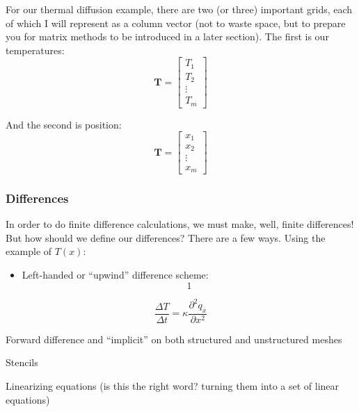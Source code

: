 \documentclass[a4paper,10pt]{scrartcl}
\begin{document}
For our thermal diffusion example, there are two (or three) important grids, each of which I will represent as a column vector (not to waste space, but to prepare you for matrix methods to be introduced in a later section). The first is our temperatures:
\begin{equation}
 \boldsymbol{T} =
 \begin{bmatrix}
  T_{1} \\
  T_{2} \\
  \vdots \\
  T_{m}
 \end{bmatrix}
\end{equation}

And the second is position:
\begin{equation}
 \boldsymbol{T} =
 \begin{bmatrix}
  x_{1} \\
  x_{2} \\
  \vdots \\
  x_{m}
 \end{bmatrix}
\end{equation}

\subsubsection{Differences}

In order to do finite difference calculations, we must make, well, finite differences! But how should we define our differences? There are a few ways. Using the example of $T(x)$:

\begin{itemize}
 \item Left-handed or ``upwind'' difference scheme:
 \begin{equation}
 1
 \end{equation}
\end{itemize}





\begin{equation}
 \frac{\Delta T}{\Delta t} = \kappa \frac{\partial^2 q_x}{\partial x^2}
\end{equation}



Forward difference and ``implicit''
on both structured and unstructured meshes

Stencils

Linearizing equations (is this the right word? turning them into a set of linear equations)
\end{document}

